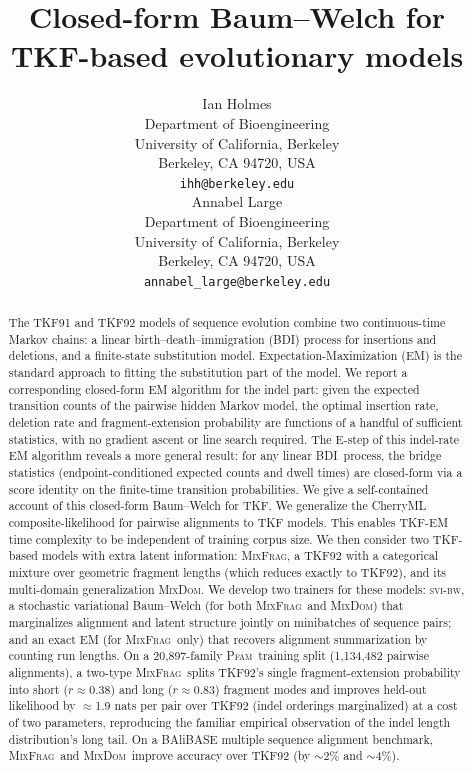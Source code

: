 \documentclass{article}
\title{Closed-form Baum--Welch for TKF-based evolutionary models}
\author{%
  Ian Holmes \\
  Department of Bioengineering\\
  University of California, Berkeley\\
  Berkeley, CA 94720, USA \\
  \texttt{ihh@berkeley.edu} \\
  \And
  Annabel Large \\
  Department of Bioengineering\\
  University of California, Berkeley\\
  Berkeley, CA 94720, USA \\
  \texttt{annabel\_large@berkeley.edu} \\
}
\newcommand{\MixFrag}{\textsc{MixFrag}}
\newcommand{\MixDom}{\textsc{MixDom}}
\newcommand{\BDI}{\textsc{BDI}}
\newcommand{\Pfam}{\textsc{Pfam}}
\newcommand{\svibw}{\textsc{svi-bw}}
\begin{document}
\maketitle

\begin{abstract}
The TKF91 and TKF92 models of sequence evolution combine two continuous-time Markov chains: a linear
birth--death--immigration (\BDI) process for insertions and deletions,
and a finite-state substitution model.
Expectation-Maximization (EM) is the standard approach to fitting the substitution part of the model.
We report a corresponding closed-form EM algorithm for the indel part:
given the expected transition counts of the pairwise hidden
Markov model, the optimal insertion rate, deletion rate and
fragment-extension probability are functions of a handful of
sufficient statistics, with no gradient ascent or line search required.
The E-step of this indel-rate EM algorithm reveals a more general result: for any linear
\BDI\ process, the bridge statistics (endpoint-conditioned expected
counts and dwell times) are closed-form via a score identity on the
finite-time transition probabilities. We give a
self-contained account of this closed-form Baum--Welch for TKF.
We generalize the CherryML composite-likelihood for pairwise alignments
to TKF models. This enables TKF-EM time complexity to be independent of training corpus size.
We then consider two TKF-based models with extra latent information:
\MixFrag, a TKF92 with a categorical mixture over geometric fragment
lengths (which reduces exactly to TKF92), and its multi-domain generalization \MixDom. 
We develop two trainers for these models: \svibw, a stochastic variational Baum--Welch 
(for both \MixFrag\ and \MixDom) that marginalizes alignment and latent structure 
jointly on minibatches of sequence pairs; and an exact EM (for \MixFrag\ only) 
that recovers alignment summarization by counting run lengths.
On a 20{,}897-family \Pfam\ training split
(1{,}134{,}482 pairwise alignments), a two-type \MixFrag\ splits TKF92's single
fragment-extension probability into short ($r{\approx}0.38$) and long
($r{\approx}0.83$) fragment modes and improves held-out likelihood by
$\approx$1.9 nats per pair over TKF92 (indel orderings marginalized) at a cost
of two parameters, reproducing the familiar empirical observation of the indel
length distribution's long tail.
On a BAliBASE multiple sequence alignment benchmark, \MixFrag\ and \MixDom\ improve accuracy over TKF92 (by ${\sim}2\%$ and ${\sim}4\%$).
\end{abstract}
\end{document}
